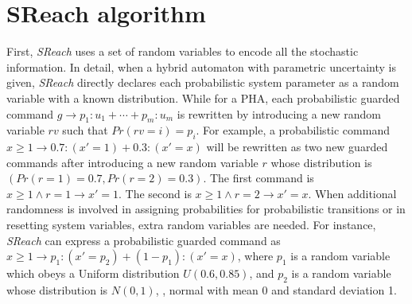\section{SReach algorithm}
First, {\it SReach} uses a set of random variables to encode all the stochastic information. In detail, when a hybrid automaton with parametric uncertainty is given, {\it SReach} directly declares each probabilistic system parameter as a random variable with a known distribution. While for a PHA, each probabilistic guarded command $g \rightarrow p_1:u_1 + \cdots + p_m:u_m$ is rewritten by introducing a new random variable $rv$ such that $Pr(rv = i) = p_i$. For example, a probabilistic command $x \geq 1 \to 0.7 : (x' = 1)+ 0.3 :( x' = x)$ will be rewritten as two new guarded commands after introducing a new random variable $r$ whose distribution is $(Pr(r=1)=0.7, Pr(r=2)=0.3)$. The first command is $x \geq 1 \wedge r = 1 \to x'=1$. The second is $x \geq 1 \wedge r = 2 \to x'=x$. When additional randomness is involved in assigning probabilities for probabilistic transitions or in resetting system variables, extra random variables are needed. For instance, {\it SReach} can express a probabilistic guarded command as $x \geq 1 \to p_1 : (x' = p_2 )+ (1-p_1) :( x' = x)$, where $p_1$ is a random variable which obeys a Uniform distribution $U(0.6,0.85)$, and $p_2$ is a random variable whose distribution is $N(0,1)$, \ie, normal with mean 0 and standard deviation 1.

